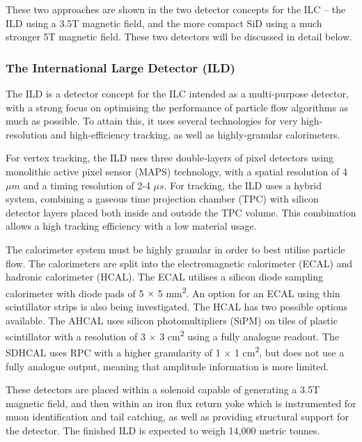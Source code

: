These two approaches are shown in the two detector concepts for the \acrshort{ILC} -- the \acrlong{ILD} using a 3.5T magnetic field, and the more compact \acrlong{SiD} using a much stronger 5T magnetic field. These two detectors will be discussed in detail below.

\subsubsection{The International Large Detector (ILD)}

The \acrfull{ILD} is a detector concept for the \acrshort{ILC} intended as a multi-purpose detector, with a strong focus on optimising the performance of particle flow algorithms as much as possible. To attain this, it uses several technologies for very high-resolution and high-efficiency tracking, as well as highly-granular calorimeters.

For vertex tracking, the \acrshort{ILD} uses three double-layers of pixel detectors using monolithic active pixel sensor (\acrshort{MAPS}) technology, with a spatial resolution of 4 $\mu m$ and a timing resolution of 2-4 $\mu s$. For tracking, the \acrshort{ILD} uses a hybrid system, combining a gaseous time projection chamber (\acrshort{TPC}) with silicon detector layers placed both inside and outside the \acrshort{TPC} volume. This combination allows a high tracking efficiency with a low material usage.

The calorimeter system must be highly granular in order to best utilise particle flow. The calorimeters are split into the electromagnetic calorimeter (\acrshort{ECAL}) and hadronic calorimeter (\acrshort{HCAL}). The \acrshort{ECAL} utilises a silicon diode sampling calorimeter with diode pads of 5 $\times$ 5 mm\textsuperscript{2}. An option for an ECAL using thin scintillator strips is also being investigated. The \acrshort{HCAL} has two possible options available. The \acrfull{AHCAL} uses silicon photomultipliers (\acrshort{SiPM}) on tiles of plastic scintillator with a resolution of 3 $\times$ 3 cm\textsuperscript{2} using a fully analogue readout. The \acrfull{SDHCAL} uses \acrfull{RPC} with a higher granularity of 1 $\times$ 1 cm\textsuperscript{2}, but does not use a fully analogue output, meaning that amplitude information is more limited. 

These detectors are placed within a solenoid capable of generating a 3.5T magnetic field, and then within an iron flux return yoke which is instrumented for muon identification and tail catching, as well as providing structural support for the detector. The finished ILD is expected to weigh 14,000 metric tonnes.

